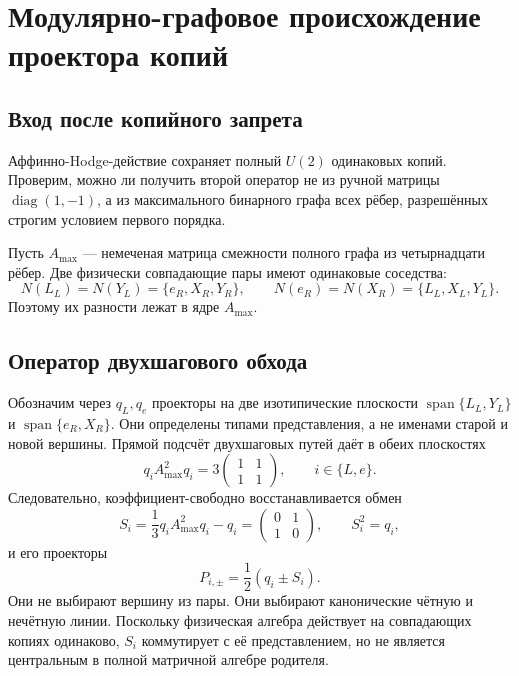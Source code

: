 \chapter{Модулярно-графовое происхождение проектора копий}
\label{ch:v7-modular-copy-projector-origin-gate}

\section{Вход после копийного запрета}

Аффинно-Hodge-действие сохраняет полный $U(2)$ одинаковых копий. Проверим,
можно ли получить второй оператор не из ручной матрицы
$\operatorname{diag}(1,-1)$, а из максимального бинарного графа всех рёбер,
разрешённых строгим условием первого порядка.

Пусть $A_{\max}$ --- немеченая матрица смежности полного графа из
четырнадцати рёбер. Две физически совпадающие пары имеют одинаковые
соседства:
\begin{equation}
 N(L_L)=N(Y_L)=\{e_R,X_R,Y_R\},
 \qquad
 N(e_R)=N(X_R)=\{L_L,X_L,Y_L\}.
 \label{eq:v7-modular-copy-twin-neighbourhoods}
\end{equation}
Поэтому их разности лежат в ядре $A_{\max}$.

\section{Оператор двухшагового обхода}

Обозначим через $q_L,q_e$ проекторы на две изотипические плоскости
$\operatorname{span}\{L_L,Y_L\}$ и
$\operatorname{span}\{e_R,X_R\}$. Они определены типами представления, а не
именами старой и новой вершины. Прямой подсчёт двухшаговых путей даёт в обеих
плоскостях
\begin{equation}
 q_i A_{\max}^2 q_i
 =3\begin{pmatrix}1&1\\1&1\end{pmatrix},
 \qquad i\in\{L,e\}.
 \label{eq:v7-modular-copy-compressed-square}
\end{equation}
Следовательно, коэффициент-свободно восстанавливается обмен
\begin{equation}
 S_i=\frac13q_iA_{\max}^2q_i-q_i
 =\begin{pmatrix}0&1\\1&0\end{pmatrix},
 \qquad S_i^2=q_i,
 \label{eq:v7-modular-copy-swap}
\end{equation}
и его проекторы
\begin{equation}
 P_{i,\pm}=\frac12(q_i\pm S_i).
 \label{eq:v7-modular-copy-parity-projectors}
\end{equation}
Они не выбирают вершину из пары. Они выбирают канонические чётную и нечётную
линии. Поскольку физическая алгебра действует на совпадающих копиях
одинаково, $S_i$ коммутирует с её представлением, но не является центральным
в полной матричной алгебре родителя.

